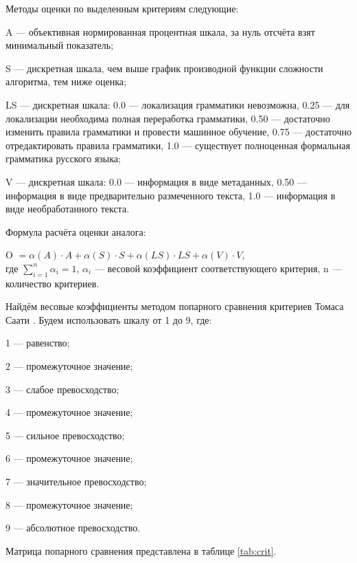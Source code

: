 Методы оценки по выделенным критериям следующие:
\begin{list}{}{\leftmargin=1.5cm}
	\item A --- объективная нормированная процентная шкала, за нуль отсчёта взят минимальный показатель;
	\item S --- дискретная шкала, чем выше график производной функции сложности алгоритма, тем ниже оценка;
	\item LS --- дискретная шкала: 0.0 --- локализация грамматики невозможна, 0.25 --- для локализации необходима полная переработка грамматики, 0.50 --- достаточно изменить правила грамматики и провести машинное обучение, 0.75 --- достаточно отредактировать правила грамматики, 1.0 --- существует полноценная формальная грамматика русского языка;
	\item V --- дискретная шкала: 0.0 --- информация в виде метаданных, 0.50 --- информация в виде предварительно размеченного текста, 1.0 --- информация в виде необработанного текста.
\end{list}

Формула расчёта оценки аналога:

O \(= \alpha(A) \cdot A + \alpha(S) \cdot S + \alpha(LS) \cdot LS + \alpha(V) \cdot V\),\\
где 
\(\sum_{i=1}^{n} \alpha_i = 1\), \(\alpha_i\) --- весовой коэффициент соответствующего критерия, n --- количество критериев.

Найдём весовые коэффициенты методом попарного сравнения критериев Томаса Саати \cite{tsaati}. 
Будем использовать шкалу от 1 до 9, где: 
\begin{list}{}{\leftmargin=1.5cm}
  \item 1 --- равенство;
  \item 2 --- промежуточное значение;
  \item 3 --- слабое превосходство;
  \item 4 --- промежуточное значение;
  \item 5 --- сильное превосходство;
  \item 6 --- промежуточное значение;
  \item 7 --- значительное превосходство;
  \item 8 --- промежуточное значение;
  \item 9 --- абсолютное превосходство.
\end{list}
Матрица попарного сравнения представлена в таблице \ref{tab:crit}.

